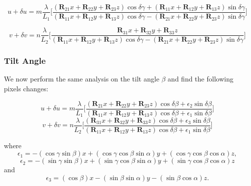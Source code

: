 \documentclass[12pt]{article}
\newcommand{\mtx}[1]{\ensuremath{\mathbf{#1}}}
\begin{document}
\begin{equation}\label{dugamma}
    u + \delta u = m\frac{\lambda}{L_1}
        \bigg[\frac{(\mtx{R}_{21}x + \mtx{R}_{22}y + \mtx{R}_{23}z)\cos\delta\gamma 
                  + (\mtx{R}_{11}x + \mtx{R}_{12}y + \mtx{R}_{13}z)\sin\delta\gamma}
                   {(\mtx{R}_{11}x + \mtx{R}_{12}y + \mtx{R}_{13}z)\cos\delta\gamma -(\mtx{R}_{21}x + \mtx{R}_{22}y + \mtx{R}_{23}z)\sin\delta\gamma}                  
        \bigg]
\end{equation}

\begin{equation}\label{dvgamma}
    v + \delta v = n\frac{\lambda}{L_2}
        \bigg[\frac{\mtx{R}_{31}x + \mtx{R}_{32}y + \mtx{R}_{33}z}
                   {(\mtx{R}_{11}x + \mtx{R}_{12}y + \mtx{R}_{13}z)\cos\delta\gamma -(\mtx{R}_{21}x + \mtx{R}_{22}y + \mtx{R}_{23}z)\sin\delta\gamma}                  
        \bigg]
\end{equation}

\subsubsection{Tilt Angle}

We now perform the same analysis on the tilt angle $\beta$ and find the following pixels changes:

\begin{equation}\label{dubeta}
    u + \delta u = m\frac{\lambda}{L_1}
        \bigg[\frac{(\mtx{R}_{21}x + \mtx{R}_{22}y + \mtx{R}_{23}z)\cos\delta\beta 
                  + \epsilon_2\sin\delta\beta}
                   {(\mtx{R}_{11}x + \mtx{R}_{12}y + \mtx{R}_{13}z)\cos\delta\beta
                  + \epsilon_1\sin\delta\beta}                  
        \bigg]
\end{equation}
\begin{equation}\label{dvbeta}
    v + \delta v = n\frac{\lambda}{L_2}
        \bigg[\frac{(\mtx{R}_{31}x + \mtx{R}_{32}y + \mtx{R}_{33}z)\cos\delta\beta 
                  + \epsilon_3\sin\delta\beta}
                   {(\mtx{R}_{11}x + \mtx{R}_{12}y + \mtx{R}_{13}z)\cos\delta\beta
                  + \epsilon_1\sin\delta\beta}                  
        \bigg]
\end{equation}

where
$$
\epsilon_1 = -(\cos\gamma\sin\beta)x + (\cos\gamma\cos\beta\sin\alpha) y + (\cos\gamma\cos\beta\cos\alpha) z,
$$
$$
\epsilon_2 = -(\sin\gamma\sin\beta)x + (\sin\gamma\cos\beta\sin\alpha) y + (\sin\gamma\cos\beta\cos\alpha) z
$$
and
$$
\epsilon_3 = (\cos\beta)x - (\sin\beta\sin\alpha) y - (\sin\beta\cos\alpha) z.
$$
\end{document}
